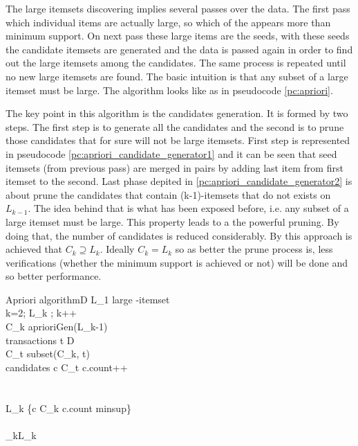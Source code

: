 The large itemsets discovering implies several passes over the data. The first
pass which individual items are actually large, so which of the appears more
than minimum support. On next pass these large items are the seeds, with these
seeds the candidate itemsets are generated and the data is passed again in order 
to find out the large itemsets among the candidates. The same process is repeated 
until no new large itemsets are found. The basic intuition is that any subset of
a large itemset must be large. The algorithm looks like as in pseudocode
\ref{pc:apriori}.

The key point in this algorithm is the candidates generation. It is formed by
two steps. The first step is to generate all the candidates and the second is to
prune those candidates that for sure will not be large itemsets. First step is
represented in pseudocode \ref{pc:apriori_candidate_generator1} and it can be
seen that seed itemsets (from previous pass) are merged in pairs by adding last
item from first itemset to the second. Last phase depited in
\ref{pc:apriori_candidate_generator2} is about prune the candidates
that contain (k-1)-itemsets that do not exists on $L_{k-1}$. The idea behind
that is what has been exposed before, i.e. any subset of a large itemset must
be large. This property leads to a the powerful pruning. By doing that, the 
number of candidates is reduced considerably. By this approach is achieved 
that $C_{k} \supseteq L_{k}$. Ideally $C_{k} = L_{k}$
so as better the prune process is, less verifications (whether the minimum
support is achieved or not) will be done and so better performance.

\begin{pseudocode}{Apriori algorithm}{D}
\label{pc:apriori}
    L_{1} \GETS large -itemset
	\\
    \FOR k=2; L_{k} \neq \emptyset; k++ \DO
	\BEGIN
         \\
        C_{k} \GETS aprioriGen(L_{k-1})\\
        \FORALL transactions \quad t \in D \DO
        \BEGIN
             \\
            C_{t} \GETS subset(C_{k}, t)\\
            \FORALL candidates \quad c \in C_{t} \DO
            \BEGIN
                c.count++\\
            \END\\
        \END\\
        L_{k} \GETS \{c \in C_{k} \mid c.count \geq minsup\}
	\END\\
	\\

    \RETURN \bigcup_{k}L_{k}
\end{pseudocode}

